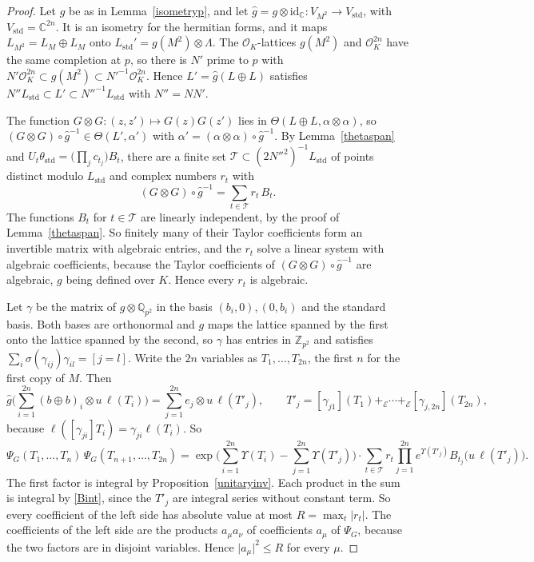 \begin{proof}
Let $g$ be as in Lemma~\ref{isometryp}, and let $\hat g=g\otimes\mathrm{id}_{\mathbb C}\colon V_{M^2}\to V_{\mathrm{std}}$, with $V_{\mathrm{std}}=\mathbb C^{2n}$. It is an isometry for the hermitian forms, and it maps $L_{M^2}=L_M\oplus L_M$ onto $L_{\mathrm{std}}'=g(M^2)\otimes\Lambda$. The $\mathcal O_K$-lattices $g(M^2)$ and $\mathcal O_K^{2n}$ have the same completion at $p$, so there is $N'$ prime to $p$ with $N'\mathcal O_K^{2n}\subset g(M^2)\subset N'^{-1}\mathcal O_K^{2n}$. Hence $L'=\hat g(L\oplus L)$ satisfies $N''L_{\mathrm{std}}\subset L'\subset N''^{-1}L_{\mathrm{std}}$ with $N''=NN'$.

The function $G\otimes G\colon(z,z')\mapsto G(z)G(z')$ lies in $\Theta(L\oplus L,\alpha\otimes\alpha)$, so $(G\otimes G)\circ\hat g^{-1}\in\Theta(L',\alpha')$ with $\alpha'=(\alpha\otimes\alpha)\circ\hat g^{-1}$. By Lemma~\ref{thetaspan} and $U_t\theta_{\mathrm{std}}=\big(\prod_jc_{t_j}\big)B_t$, there are a finite set $\mathcal T\subset(2N''^2)^{-1}L_{\mathrm{std}}$ of points distinct modulo $L_{\mathrm{std}}$ and complex numbers $r_t$ with
\[
(G\otimes G)\circ\hat g^{-1}=\sum_{t\in\mathcal T}r_t\,B_t .
\]
The functions $B_t$ for $t\in\mathcal T$ are linearly independent, by the proof of Lemma~\ref{thetaspan}. So finitely many of their Taylor coefficients form an invertible matrix with algebraic entries, and the $r_t$ solve a linear system with algebraic coefficients, because the Taylor coefficients of $(G\otimes G)\circ\hat g^{-1}$ are algebraic, $g$ being defined over $K$. Hence every $r_t$ is algebraic.

Let $\gamma$ be the matrix of $g\otimes\mathbb Q_{p^2}$ in the basis $(b_i,0),(0,b_i)$ and the standard basis. Both bases are orthonormal and $g$ maps the lattice spanned by the first onto the lattice spanned by the second, so $\gamma$ has entries in $\mathbb Z_{p^2}$ and satisfies $\sum_i\sigma(\gamma_{ij})\gamma_{il}=[j=l]$. Write the $2n$ variables as $T_1,\dots,T_{2n}$, the first $n$ for the first copy of $M$. Then
\[
\hat g\Big(\sum_{i=1}^{2n}(b\oplus b)_i\otimes u\,\ell(T_i)\Big)=\sum_{j=1}^{2n}e_j\otimes u\,\ell(T'_j),\qquad T'_j=[\gamma_{j1}](T_1)+_{\mathcal E}\cdots+_{\mathcal E}[\gamma_{j,2n}](T_{2n}),
\]
because $\ell([\gamma_{ji}]T_i)=\gamma_{ji}\ell(T_i)$. So
\[
\Psi_G(T_1,\dots,T_n)\,\Psi_G(T_{n+1},\dots,T_{2n})=\exp\Big(\sum_{i=1}^{2n}\Upsilon(T_i)-\sum_{j=1}^{2n}\Upsilon(T'_j)\Big)\cdot\sum_{t\in\mathcal T}r_t\prod_{j=1}^{2n}e^{\Upsilon(T'_j)}B_{t_j}\big(u\,\ell(T'_j)\big).
\]
The first factor is integral by Proposition~\ref{unitaryinv}. Each product in the sum is integral by \eqref{Bint}, since the $T'_j$ are integral series without constant term. So every coefficient of the left side has absolute value at most $R=\max_t\lvert r_t\rvert$. The coefficients of the left side are the products $a_\mu a_\nu$ of coefficients $a_\mu$ of $\Psi_G$, because the two factors are in disjoint variables. Hence $\lvert a_\mu\rvert^2\le R$ for every $\mu$.
\end{proof}


